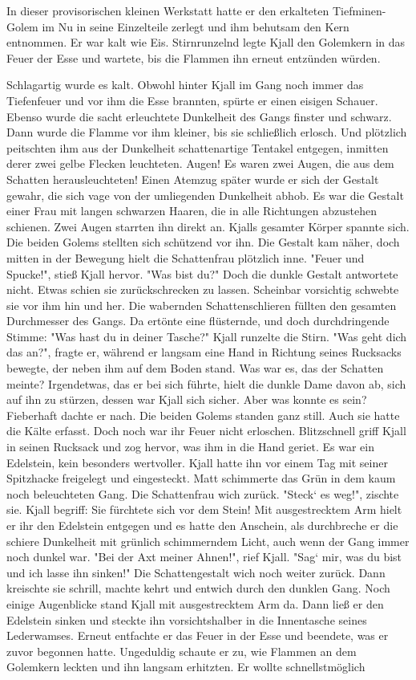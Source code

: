 \documentclass[10pt, a4paper, oneside]{book}
\begin{document}
\begin{multicols}{2}
In dieser provisorischen kleinen Werkstatt hatte er den erkalteten Tiefminen-Golem im Nu in seine Einzelteile zerlegt und ihm behutsam den Kern entnommen. Er war kalt wie Eis. Stirnrunzelnd legte Kjall den Golemkern in das Feuer der Esse und wartete, bis die Flammen ihn erneut entzünden würden.\bigskip

Schlagartig wurde es kalt. Obwohl hinter Kjall im Gang noch immer das Tiefenfeuer und vor ihm die Esse brannten, spürte er einen eisigen Schauer. Ebenso wurde die sacht erleuchtete Dunkelheit des Gangs finster und schwarz. Dann wurde die Flamme vor ihm kleiner, bis sie schließlich erlosch. Und plötzlich peitschten ihm aus der Dunkelheit schattenartige Tentakel entgegen, inmitten derer zwei gelbe Flecken leuchteten. Augen! Es waren zwei Augen, die aus dem Schatten herausleuchteten! Einen Atemzug später wurde er sich der Gestalt gewahr, die sich vage von der umliegenden Dunkelheit abhob. Es war die Gestalt einer Frau mit langen schwarzen Haaren, die in alle Richtungen abzustehen schienen. Zwei Augen starrten ihn direkt an. Kjalls gesamter Körper spannte sich. Die beiden Golems stellten sich schützend vor ihn. Die Gestalt kam näher, doch mitten in der Bewegung hielt die Schattenfrau plötzlich inne. "Feuer und Spucke!", stieß Kjall hervor. "Was bist du?" Doch die dunkle Gestalt antwortete nicht. Etwas schien sie zurückschrecken zu lassen. Scheinbar vorsichtig schwebte sie vor ihm hin und her. Die wabernden Schattenschlieren füllten den gesamten Durchmesser des Gangs. Da ertönte eine flüsternde, und doch durchdringende Stimme: "Was hast du in deiner Tasche?" Kjall runzelte die Stirn. "Was geht dich das an?", fragte er, während er langsam eine Hand in Richtung seines Rucksacks bewegte, der neben ihm auf dem Boden stand. Was war es, das der Schatten meinte? Irgendetwas, das er bei sich führte, hielt die dunkle Dame davon ab, sich auf ihn zu stürzen, dessen war Kjall sich sicher. Aber was konnte es sein? Fieberhaft dachte er nach. Die beiden Golems standen ganz still. Auch sie hatte die Kälte erfasst. Doch noch war ihr Feuer nicht erloschen. Blitzschnell griff Kjall in seinen Rucksack und zog hervor, was ihm in die Hand geriet. Es war ein Edelstein, kein besonders wertvoller. Kjall hatte ihn vor einem Tag mit seiner Spitzhacke freigelegt und eingesteckt. Matt schimmerte das Grün in dem kaum noch beleuchteten Gang. Die Schattenfrau wich zurück. "Steck‘ es weg!", zischte sie. Kjall begriff: Sie fürchtete sich vor dem Stein! Mit ausgestrecktem Arm hielt er ihr den Edelstein entgegen und es hatte den Anschein, als durchbreche er die schiere Dunkelheit mit grünlich schimmerndem Licht, auch wenn der Gang immer noch dunkel war. "Bei der Axt meiner Ahnen!", rief Kjall. "Sag‘ mir, was du bist und ich lasse ihn sinken!" Die Schattengestalt wich noch weiter zurück. Dann kreischte sie schrill, machte kehrt und entwich durch den dunklen Gang. Noch einige Augenblicke stand Kjall mit ausgestrecktem Arm da. Dann ließ er den Edelstein sinken und steckte ihn vorsichtshalber in die Innentasche seines Lederwamses. Erneut entfachte er das Feuer in der Esse und beendete, was er zuvor begonnen hatte. Ungeduldig schaute er zu, wie Flammen an dem Golemkern leckten und ihn langsam erhitzten. Er wollte schnellstmöglich 
\end{multicols}
\end{document}
